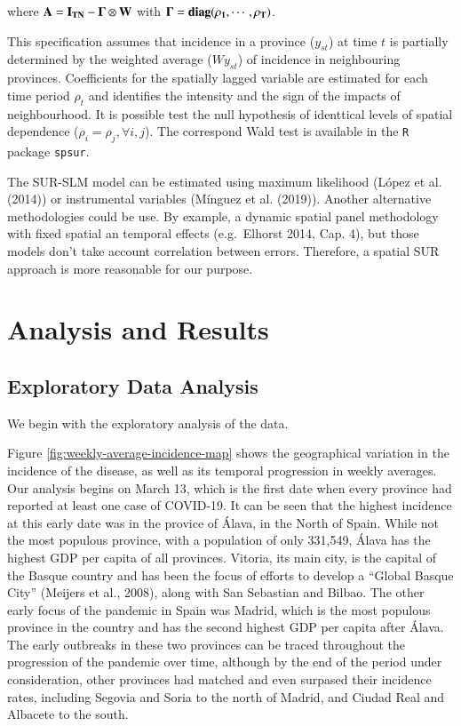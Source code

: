 \documentclass[]{elsarticle} %
\begin{document}
\noindent where \(\bf{A} =I_{TN}-\bf{\Gamma} \otimes W\) with
\(\bf{\Gamma} = diag(\rho_1, \cdots, \rho_T)\).

This specification assumes that incidence in a province (\(y_{st}\)) at
time \(t\) is partially determined by the weighted average (\(Wy_{st}\))
of incidence in neighbouring provinces. Coefficients for the spatially
lagged variable are estimated for each time period \(\rho_t\) and
identifies the intensity and the sign of the impacts of neighbourhood.
It is possible test the null hypothesis of identtical levels of spatial
dependence (\(\rho_i=\rho_j, \forall i,j\)). The correspond Wald test is
available in the \texttt{R} package \texttt{spsur}.

The SUR-SLM model can be estimated using maximum likelihood (López et
al. (2014)) or instrumental variables (Mínguez et al. (2019)). Another
alternative methodologies could be use. By example, a dynamic spatial
panel methodology with fixed spatial an temporal effects (e.g.~Elhorst
2014, Cap. 4), but those models don't take account correlation between
errors. Therefore, a spatial SUR approach is more reasonable for our
purpose.

\hypertarget{analysis-and-results}{%
\section{Analysis and Results}\label{analysis-and-results}}

\hypertarget{exploratory-data-analysis}{%
\subsection{Exploratory Data Analysis}\label{exploratory-data-analysis}}

We begin with the exploratory analysis of the data.

Figure \ref{fig:weekly-average-incidence-map} shows the geographical
variation in the incidence of the disease, as well as its temporal
progression in weekly averages. Our analysis begins on March 13, which
is the first date when every province had reported at least one case of
COVID-19. It can be seen that the highest incidence at this early date
was in the provice of Álava, in the North of Spain. While not the most
populous province, with a population of only 331,549, Álava has the
highest GDP per capita of all provinces. Vitoria, its main city, is the
capital of the Basque country and has been the focus of efforts to
develop a ``Global Basque City'' (Meijers et al., 2008), along with San
Sebastian and Bilbao. The other early focus of the pandemic in Spain was
Madrid, which is the most populous province in the country and has the
second highest GDP per capita after Álava. The early outbreaks in these
two provinces can be traced throughout the progression of the pandemic
over time, although by the end of the period under consideration, other
provinces had matched and even surpased their incidence rates, including
Segovia and Soria to the north of Madrid, and Ciudad Real and Albacete
to the south.
\end{document}
